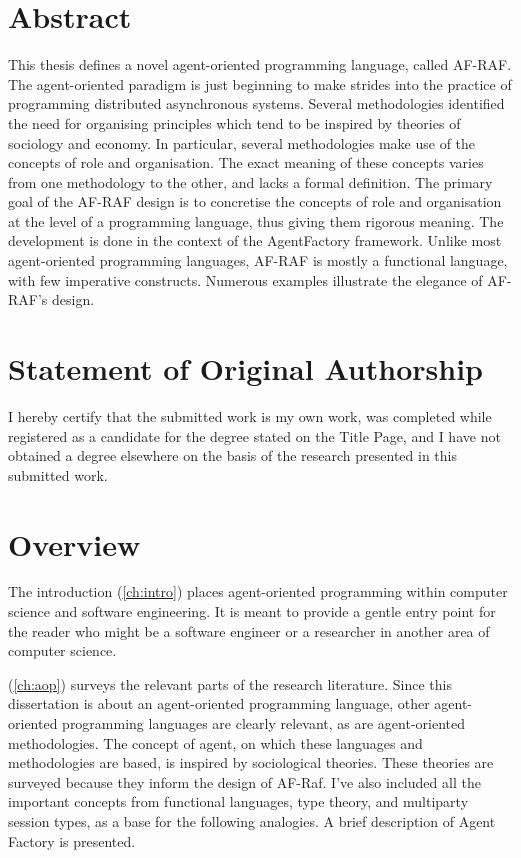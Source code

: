 \documentclass[a4paper,12pt,oneside,fleqn]{book} %
\newcommand{\rg}[1]{\marginpar{\tiny\raggedright\textcolor{blue}{\bf rg:} #1}}
\renewcommand{\rg}{}
\begin{document}
\chapter*{Abstract} %

This thesis defines a novel agent-oriented programming language, called
AF-RAF\null.  The agent-oriented paradigm is just beginning to make strides
into the practice of programming distributed asynchronous systems.
Several methodologies identified the need for organising principles which
tend to be inspired by theories of sociology and economy.  In particular,
several methodologies make use of the concepts of role and organisation.
The exact meaning of these concepts varies from one methodology to the
other, and lacks a formal definition.  The primary goal of the AF-RAF
design is to concretise the concepts of role and organisation at the level
of a programming language, thus giving them rigorous meaning. The
development is done in the context of the AgentFactory framework.  Unlike
most agent-oriented programming languages, AF-RAF is mostly a functional
language, with few imperative constructs.  Numerous examples illustrate the
elegance of AF-RAF's design.


\chapter*{Statement of Original Authorship} %

I hereby certify that the submitted work is my own work, was completed
while registered as a candidate for the degree stated on the Title Page,
and I have not obtained a degree elsewhere on the basis of the research
presented in this submitted work.



\chapter*{Overview} %

The introduction (\autoref{ch:intro}) places agent-oriented programming
within computer science and software engineering. It is meant to provide a
gentle entry point for the reader who might be a software engineer or a
researcher in another area of computer science.

(\autoref{ch:aop}) surveys the relevant parts of the research literature. Since this dissertation is about an agent-oriented
programming language, other agent-oriented programming languages are
clearly relevant, as are agent-oriented methodologies. The concept of
agent, on which these languages and methodologies are based, is inspired by
sociological theories. These theories are surveyed because they inform the
design of AF-Raf. I've also included all the important concepts from
functional languages, type theory, and  multiparty session types, as a base
for the following analogies. A brief description of Agent Factory is presented.
\end{document}
